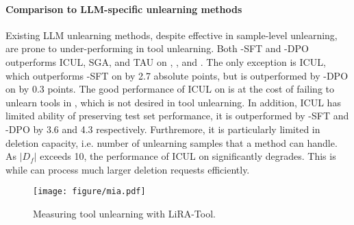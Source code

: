 \paragraph{Comparison to LLM-specific unlearning methods}
Existing LLM unlearning methods, despite effective in sample-level unlearning, are prone to under-performing in tool unlearning. Both \method-SFT and \method-DPO outperforms ICUL, SGA, and TAU on \ttest, \tr, \tf and \tg. The only exception is ICUL, which outperforms \method-SFT on \tr by 2.7 absolute points, but is outperformed by \method-DPO on \tr by 0.3 points. The good performance of ICUL on \tr is at the cost of failing to unlearn tools in \tf, which is not desired in tool unlearning. In addition,  ICUL has limited ability of preserving test set performance, it is outperformed by \method-SFT and \method-DPO by 3.6 and 4.3 respectively. Furthremore, it is particularly limited in deletion capacity, i.e. number of unlearning samples that a method can handle. As $|D_f|$ exceeds 10, the performance of ICUL on \ttest significantly degrades. This is while \method can process much larger deletion requests efficiently. 



\begin{figure}
\vskip 0.2in
\begin{center}
\centerline{\texttt{[image: figure/mia.pdf]}}
\caption{Measuring tool unlearning with LiRA-Tool.}%
\label{fig:mia}
\end{center}
\vskip -0.2in
\end{figure}

